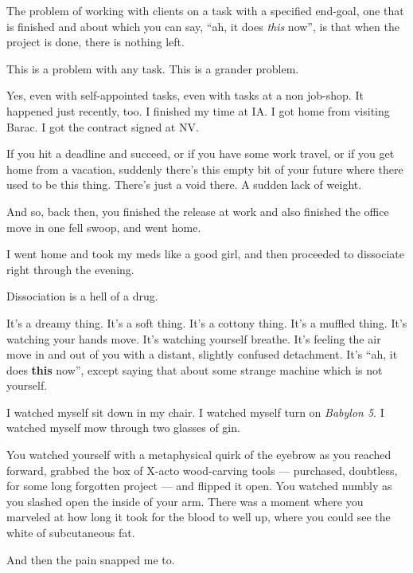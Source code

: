 The problem of working with clients on a task with a specified end-goal, one that is finished and about which you can say, ``ah, it does \emph{this} now'', is that when the project is done, there is nothing left.

\begin{ally}
This is a problem with any task. This is a grander problem.
\end{ally}
Yes, even with self-appointed tasks, even with tasks at a non job-shop. It happened just recently, too. I finished my time at IA. I got home from visiting Barac. I got the contract signed at NV.

If you hit a deadline and succeed, or if you have some work travel, or if you get home from a vacation, suddenly there's this empty bit of your future where there used to be this thing. There's just a void there. A sudden lack of weight.

\begin{ally}
And so, back then, you finished the release at work and also finished the office move in one fell swoop, and went home.
\end{ally}
I went home and took my meds like a good girl, and then proceeded to dissociate right through the evening.

Dissociation is a hell of a drug.

\begin{ally}
It's a dreamy thing. It's a soft thing. It's a cottony thing. It's a muffled thing. It's watching your hands move. It's watching yourself breathe. It's feeling the air move in and out of you with a distant, slightly confused detachment. It's ``ah, it does \textbf{this} now'', except saying that about some strange machine which is not yourself.
\end{ally}
I watched myself sit down in my chair. I watched myself turn on \emph{Babylon 5}. I watched myself mow through two glasses of gin.

\begin{ally}
You watched yourself with a metaphysical quirk of the eyebrow as you reached forward, grabbed the box of X-acto wood-carving tools --- purchased, doubtless, for some long forgotten project --- and flipped it open. You watched numbly as you slashed open the inside of your arm. There was a moment where you marveled at how long it took for the blood to well up, where you could see the white of subcutaneous fat.
\end{ally}
And then the pain snapped me to.
\newpage

